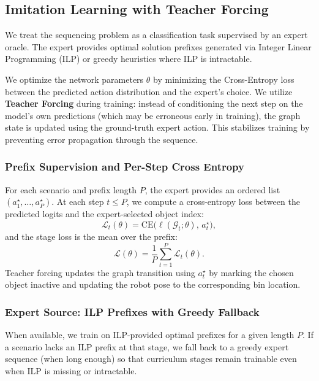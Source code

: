 \documentclass[conference]{IEEEtran}
\begin{document}
\subsection{Imitation Learning with Teacher Forcing}
We treat the sequencing problem as a classification task supervised by an expert oracle. The expert provides optimal solution prefixes generated via Integer Linear Programming (ILP) or greedy heuristics where ILP is intractable.

We optimize the network parameters $\theta$ by minimizing the Cross-Entropy loss between the predicted action distribution and the expert's choice. We utilize \textbf{Teacher Forcing} during training: instead of conditioning the next step on the model's own predictions (which may be erroneous early in training), the graph state is updated using the ground-truth expert action. This stabilizes training by preventing error propagation through the sequence.

\subsubsection{Prefix Supervision and Per-Step Cross Entropy}
For each scenario and prefix length $P$, the expert provides an ordered list $(a_1^\star,\dots,a_P^\star)$.
At each step $t\le P$, we compute a cross-entropy loss between the predicted logits and the expert-selected object index:
\begin{equation}
\mathcal{L}_t(\theta) = \text{CE}\big(\ell(\mathcal{G}_t;\theta),\, a_t^\star\big),
\end{equation}
and the stage loss is the mean over the prefix:
\begin{equation}
\mathcal{L}(\theta)=\frac{1}{P}\sum_{t=1}^{P}\mathcal{L}_t(\theta).
\end{equation}
Teacher forcing updates the graph transition using $a_t^\star$ by marking the chosen object inactive and updating the robot pose to the corresponding bin location.

\subsubsection{Expert Source: ILP Prefixes with Greedy Fallback}
When available, we train on ILP-provided optimal prefixes for a given length $P$.
If a scenario lacks an ILP prefix at that stage, we fall back to a greedy expert sequence (when long enough) so that curriculum stages remain trainable even when ILP is missing or intractable.
\end{document}

